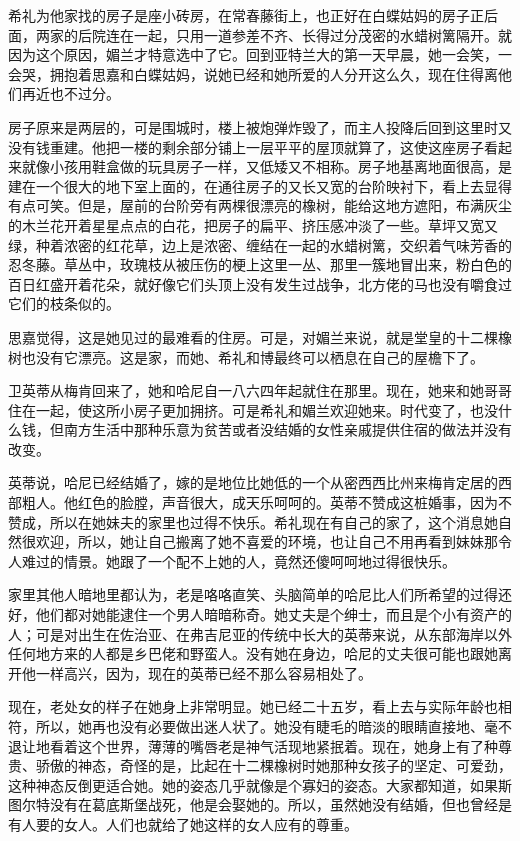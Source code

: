 \par 希礼为他家找的房子是座小砖房，在常春藤街上，也正好在白蝶姑妈的房子正后面，两家的后院连在一起，只用一道参差不齐、长得过分茂密的水蜡树篱隔开。就因为这个原因，媚兰才特意选中了它。回到亚特兰大的第一天早晨，她一会笑，一会哭，拥抱着思嘉和白蝶姑妈，说她已经和她所爱的人分开这么久，现在住得离他们再近也不过分。
\par 房子原来是两层的，可是围城时，楼上被炮弹炸毁了，而主人投降后回到这里时又没有钱重建。他把一楼的剩余部分铺上一层平平的屋顶就算了，这使这座房子看起来就像小孩用鞋盒做的玩具房子一样，又低矮又不相称。房子地基离地面很高，是建在一个很大的地下室上面的，在通往房子的又长又宽的台阶映衬下，看上去显得有点可笑。但是，屋前的台阶旁有两棵很漂亮的橡树，能给这地方遮阳，布满灰尘的木兰花开着星星点点的白花，把房子的扁平、挤压感冲淡了一些。草坪又宽又绿，种着浓密的红花草，边上是浓密、缠结在一起的水蜡树篱，交织着气味芳香的忍冬藤。草丛中，玫瑰枝从被压伤的梗上这里一丛、那里一簇地冒出来，粉白色的百日红盛开着花朵，就好像它们头顶上没有发生过战争，北方佬的马也没有嚼食过它们的枝条似的。
\par 思嘉觉得，这是她见过的最难看的住房。可是，对媚兰来说，就是堂皇的十二棵橡树也没有它漂亮。这是家，而她、希礼和博最终可以栖息在自己的屋檐下了。
\par 卫英蒂从梅肯回来了，她和哈尼自一八六四年起就住在那里。现在，她来和她哥哥住在一起，使这所小房子更加拥挤。可是希礼和媚兰欢迎她来。时代变了，也没什么钱，但南方生活中那种乐意为贫苦或者没结婚的女性亲戚提供住宿的做法并没有改变。
\par 英蒂说，哈尼已经结婚了，嫁的是地位比她低的一个从密西西比州来梅肯定居的西部粗人。他红色的脸膛，声音很大，成天乐呵呵的。英蒂不赞成这桩婚事，因为不赞成，所以在她妹夫的家里也过得不快乐。希礼现在有自己的家了，这个消息她自然很欢迎，所以，她让自己搬离了她不喜爱的环境，也让自己不用再看到妹妹那令人难过的情景。她跟了一个配不上她的人，竟然还傻呵呵地过得很快乐。
\par 家里其他人暗地里都认为，老是咯咯直笑、头脑简单的哈尼比人们所希望的过得还好，他们都对她能逮住一个男人暗暗称奇。她丈夫是个绅士，而且是个小有资产的人；可是对出生在佐治亚、在弗吉尼亚的传统中长大的英蒂来说，从东部海岸以外任何地方来的人都是乡巴佬和野蛮人。没有她在身边，哈尼的丈夫很可能也跟她离开他一样高兴，因为，现在的英蒂已经不那么容易相处了。
\par 现在，老处女的样子在她身上非常明显。她已经二十五岁，看上去与实际年龄也相符，所以，她再也没有必要做出迷人状了。她没有睫毛的暗淡的眼睛直接地、毫不退让地看着这个世界，薄薄的嘴唇老是神气活现地紧抿着。现在，她身上有了种尊贵、骄傲的神态，奇怪的是，比起在十二棵橡树时她那种女孩子的坚定、可爱劲，这种神态反倒更适合她。她的姿态几乎就像是个寡妇的姿态。大家都知道，如果斯图尔特没有在葛底斯堡战死，他是会娶她的。所以，虽然她没有结婚，但也曾经是有人要的女人。人们也就给了她这样的女人应有的尊重。
